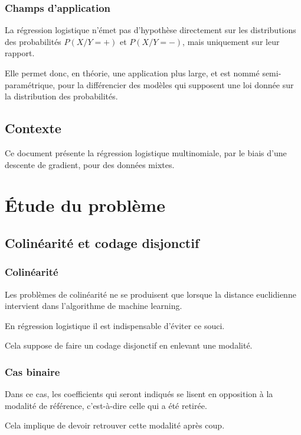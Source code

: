\documentclass[10pt,french]{report}
\begin{document}
	\subsection{Champs d'application}

    La régression logistique n'émet pas d'hypothèse directement sur les distributions des probabilités $P\left(X/Y=+\right)$ et $P\left(X/Y=-\right)$, mais uniquement sur leur rapport.

    Elle permet donc, en théorie, une application plus large, et est nommé semi-paramétrique, pour la différencier des modèles qui supposent une loi donnée sur la distribution des probabilités.

	\section{Contexte}

	Ce document présente la régression logistique multinomiale, par le biais d'une descente de gradient, pour des données mixtes.

	\chapter{Étude du problème}

	\section{Colinéarité et codage disjonctif}

	\subsection{Colinéarité}
	Les problèmes de colinéarité ne se produisent que lorsque la distance euclidienne intervient dans l'algorithme de machine learning.

	En régression logistique il est indispensable d'éviter ce souci.

	Cela suppose de faire un codage disjonctif en enlevant une modalité.

	\subsection{Cas binaire}

	Dans ce cas, les coefficients qui seront indiqués se lisent en opposition à la modalité de référence, c'est-à-dire celle qui a été retirée.

	Cela implique de devoir retrouver cette modalité après coup.
\end{document}

